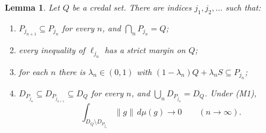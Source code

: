 \documentclass[11pt]{article}
\newtheorem{lemma}[theorem]{Lemma}
\theoremstyle{definition}
\begin{document}
\begin{lemma}\label{lem:approx}
Let $Q$ be a credal set. There are indices $j_1,j_2,\dots$ such that:
\begin{enumerate}[label=(\alph*)]
\item $P_{j_{n+1}}\subseteq P_{j_n}$ for every $n$, and $\bigcap_nP_{j_n}=Q$;
\item every inequality of $\ell_{j_n}$ has a strict margin on $Q$;
\item for each $n$ there is $\lambda_n\in(0,1)$ with $(1-\lambda_n)Q+\lambda_nS\subseteq P_{j_n}$;
\item $D_{P_{j_n}}\subseteq D_{P_{j_{n+1}}}\subseteq D_Q$ for every $n$, and $\bigcup_nD_{P_{j_n}}=D_Q$. Under (M1),
\[\int_{D_Q\setminus D_{P_{j_n}}}\|g\|\,d\mu(g)\to0\qquad(n\to\infty).\]
\end{enumerate}
\end{lemma}
\end{document}
